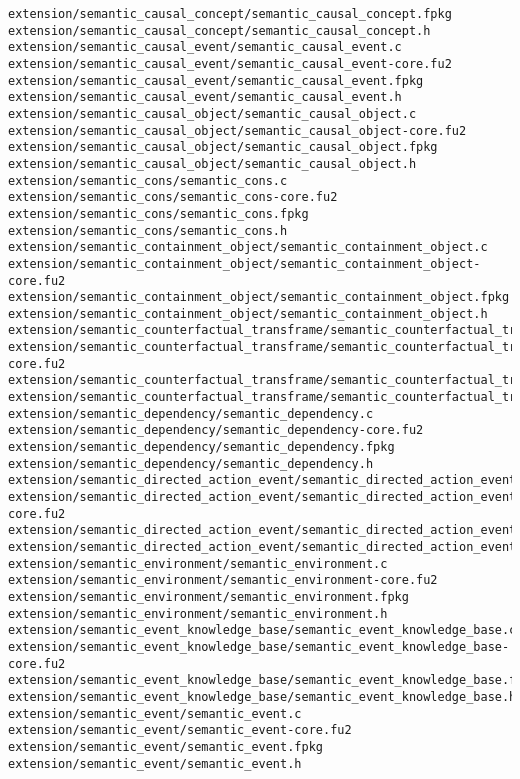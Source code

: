 \begin{lstlisting}
extension/semantic_causal_concept/semantic_causal_concept.fpkg
extension/semantic_causal_concept/semantic_causal_concept.h
extension/semantic_causal_event/semantic_causal_event.c
extension/semantic_causal_event/semantic_causal_event-core.fu2
extension/semantic_causal_event/semantic_causal_event.fpkg
extension/semantic_causal_event/semantic_causal_event.h
extension/semantic_causal_object/semantic_causal_object.c
extension/semantic_causal_object/semantic_causal_object-core.fu2
extension/semantic_causal_object/semantic_causal_object.fpkg
extension/semantic_causal_object/semantic_causal_object.h
extension/semantic_cons/semantic_cons.c
extension/semantic_cons/semantic_cons-core.fu2
extension/semantic_cons/semantic_cons.fpkg
extension/semantic_cons/semantic_cons.h
extension/semantic_containment_object/semantic_containment_object.c
extension/semantic_containment_object/semantic_containment_object-core.fu2
extension/semantic_containment_object/semantic_containment_object.fpkg
extension/semantic_containment_object/semantic_containment_object.h
extension/semantic_counterfactual_transframe/semantic_counterfactual_transframe.c
extension/semantic_counterfactual_transframe/semantic_counterfactual_transframe-core.fu2
extension/semantic_counterfactual_transframe/semantic_counterfactual_transframe.fpkg
extension/semantic_counterfactual_transframe/semantic_counterfactual_transframe.h
extension/semantic_dependency/semantic_dependency.c
extension/semantic_dependency/semantic_dependency-core.fu2
extension/semantic_dependency/semantic_dependency.fpkg
extension/semantic_dependency/semantic_dependency.h
extension/semantic_directed_action_event/semantic_directed_action_event.c
extension/semantic_directed_action_event/semantic_directed_action_event-core.fu2
extension/semantic_directed_action_event/semantic_directed_action_event.fpkg
extension/semantic_directed_action_event/semantic_directed_action_event.h
extension/semantic_environment/semantic_environment.c
extension/semantic_environment/semantic_environment-core.fu2
extension/semantic_environment/semantic_environment.fpkg
extension/semantic_environment/semantic_environment.h
extension/semantic_event_knowledge_base/semantic_event_knowledge_base.c
extension/semantic_event_knowledge_base/semantic_event_knowledge_base-core.fu2
extension/semantic_event_knowledge_base/semantic_event_knowledge_base.fpkg
extension/semantic_event_knowledge_base/semantic_event_knowledge_base.h
extension/semantic_event/semantic_event.c
extension/semantic_event/semantic_event-core.fu2
extension/semantic_event/semantic_event.fpkg
extension/semantic_event/semantic_event.h

\end{lstlisting}
